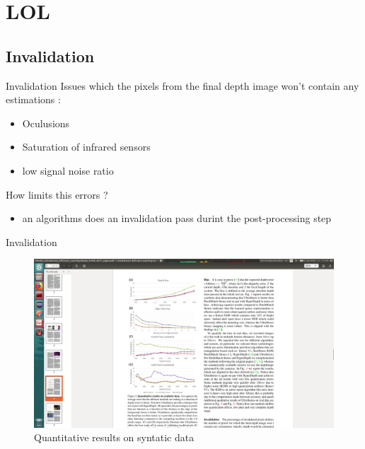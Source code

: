 %
%
\section{LOL}%
\subsection{Invalidation}
\begin{frame}{Invalidation}
Issues which the pixels from the final depth image won't contain any estimations :
\begin{itemize}
\item Oculusions
\item Saturation of infrared sensors
\item low signal noise ratio
\end{itemize}
How limits this errors ?
\begin{itemize}
\item an algorithms does an invalidation pass durint the post-processing step
\end{itemize}
\end{frame}

\begin{frame}{Invalidation}
\begin{figure}
\includegraphics[scale=0.06]{pictures/fig3}
\caption{Quantitative results on syntatic data}
\end{figure}
\end{frame}

